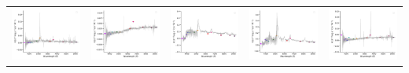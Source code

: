 \begin{center}
\begin{longtable}{l l l l l }
    \includegraphics[width=0.2\linewidth, clip]{Figs/Figs-sdss/spec-4004-55321-0054-SPLUS-n02s37-051418.pdf} & \includegraphics[width=0.2\linewidth, clip]{Figs/Figs-sdss/spec-4194-55450-0185-STRIPE82-0119-046591.pdf} & \includegraphics[width=0.2\linewidth, clip]{Figs/Figs-sdss/spec-4194-55450-0940-STRIPE82-0120-007072.pdf} & \includegraphics[width=0.2\linewidth, clip]{Figs/Figs-sdss/spec-4197-55479-0626-STRIPE82-0126-031903.pdf} & \includegraphics[width=0.2\linewidth, clip]{Figs/Figs-sdss/spec-4200-55499-0994-STRIPE82-0136-009636.pdf} \\

\end{longtable}
\end{center}
